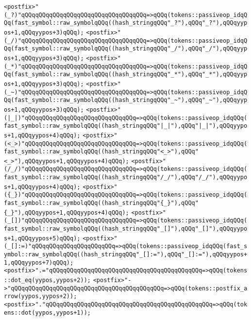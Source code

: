 \verb|<postfix>"(_?)"qQQqqQQqqQQqqQQqqQQqqQQqqQQqqQQqqQQq=>qQQq(tokens::passiveop_idqQQq(fast_symbol::raw_symbolqQQq((hash_stringqQQq"_?"),qQQq"_?"),qQQqyypos+1,qQQqyypos+3)qQQq);|\newline
\verb|<postfix>"(_/)"qQQqqQQqqQQqqQQqqQQqqQQqqQQqqQQqqQQq=>qQQq(tokens::passiveop_idqQQq(fast_symbol::raw_symbolqQQq((hash_stringqQQq"_/"),qQQq"_/"),qQQqyypos+1,qQQqyypos+3)qQQq);|\newline
\verb|<postfix>"(_*)"qQQqqQQqqQQqqQQqqQQqqQQqqQQqqQQqqQQq=>qQQq(tokens::passiveop_idqQQq(fast_symbol::raw_symbolqQQq((hash_stringqQQq"_*"),qQQq"_*"),qQQqyypos+1,qQQqyypos+3)qQQq);|\newline
\verb|<postfix>"(_~)"qQQqqQQqqQQqqQQqqQQqqQQqqQQqqQQqqQQq=>qQQq(tokens::passiveop_idqQQq(fast_symbol::raw_symbolqQQq((hash_stringqQQq"_~"),qQQq"_~"),qQQqyypos+1,qQQqyypos+3)qQQq);|\newline
\verb|<postfix>"(|\verb#|_|)"qQQqqQQqqQQqqQQqqQQqqQQqqQQqqQQq=>qQQq(tokens::passiveop_idqQQq(fast_symbol::raw_symbolqQQq((hash_stringqQQq"|_|"),qQQq"|_|"),qQQqyypos+1,qQQqyypos+4)qQQq);#\newline
\verb|<postfix>"(<_>)"qQQqqQQqqQQqqQQqqQQqqQQqqQQqqQQq=>qQQq(tokens::passiveop_idqQQq(fast_symbol::raw_symbolqQQq((hash_stringqQQq"<_>"),qQQq"<_>"),qQQqyypos+1,qQQqyypos+4)qQQq);|\newline
\verb|<postfix>"(/_/)"qQQqqQQqqQQqqQQqqQQqqQQqqQQqqQQq=>qQQq(tokens::passiveop_idqQQq(fast_symbol::raw_symbolqQQq((hash_stringqQQq"/_/"),qQQq"/_/"),qQQqyypos+1,qQQqyypos+4)qQQq);|\newline
\verb|<postfix>"({_})"qQQqqQQqqQQqqQQqqQQqqQQqqQQqqQQq=>qQQq(tokens::passiveop_idqQQq(fast_symbol::raw_symbolqQQq((hash_stringqQQq"{_}"),qQQq"{_}"),qQQqyypos+1,qQQqyypos+4)qQQq);|\newline
\verb|<postfix>"(_[])"qQQqqQQqqQQqqQQqqQQqqQQqqQQqqQQq=>qQQq(tokens::passiveop_idqQQq(fast_symbol::raw_symbolqQQq((hash_stringqQQq"_[]"),qQQq"_[]"),qQQqyypos+1,qQQqyypos+5)qQQq);|\newline
\verb|<postfix>"(_[]:=)"qQQqqQQqqQQqqQQqqQQqqQQq=>qQQq(tokens::passiveop_idqQQq(fast_symbol::raw_symbolqQQq((hash_stringqQQq"_[]:="),qQQq"_[]:="),qQQqyypos+1,qQQqyypos+7)qQQq);|\newline
\verb|<postfix>".="qQQqqQQqqQQqqQQqqQQqqQQqqQQqqQQqqQQqqQQqqQQq=>qQQq(tokens::dot_eq(yypos,yypos+2));|\newline
\verb|<postfix>"->"qQQqqQQqqQQqqQQqqQQqqQQqqQQqqQQqqQQqqQQqqQQq=>qQQq(tokens::postfix_arrow(yypos,yypos+2));|\newline
\verb|<postfix>"."qQQqqQQqqQQqqQQqqQQqqQQqqQQqqQQqqQQqqQQqqQQqqQQq=>qQQq(tokens::dot(yypos,yypos+1));|\newline
